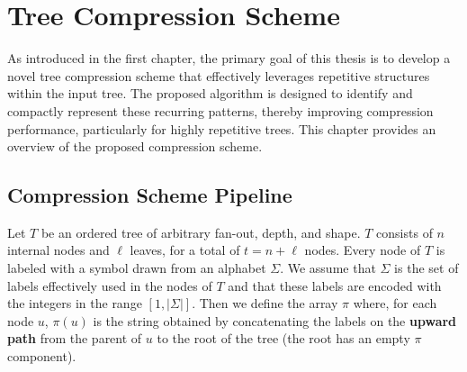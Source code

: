 \chapter{Tree Compression Scheme} \label{chp:project_overview}
As introduced in the first chapter, the primary goal of this thesis is to develop a novel tree compression scheme that effectively leverages repetitive structures within the input tree. The proposed algorithm is designed to identify and compactly represent these recurring patterns, thereby improving compression performance, particularly for highly repetitive trees. This chapter provides an overview of the proposed compression scheme.

\section{Compression Scheme Pipeline}
Let $ T $ be an ordered tree of arbitrary fan-out, depth, and shape. $ T $ consists of $ n $ internal nodes and $ \ell $ leaves, for a total of $ t = n + \ell $ nodes. Every node of $ T $ is labeled with a symbol drawn from an alphabet $ \Sigma $. We assume that $ \Sigma $ is the set of labels effectively used in the nodes of $T$ and that these labels are encoded with the integers in the range $[1, |\Sigma|]$. Then we define the array $\pi$ where, for each node $u$, $\pi(u)$ is the string obtained by concatenating the labels on the \textbf{upward path} from the parent of $u$ to the root of the tree (the root has an empty $\pi$ component).

